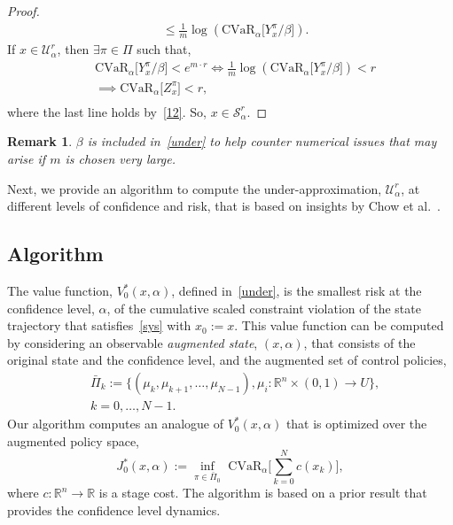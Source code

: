 \documentclass[letterpaper, 10 pt, conference]{ieeeconf}  %
\newtheorem{remark}{Remark}
\begin{document}
\begin{proof}
\begin{equation}
\begin{aligned}
& \leq \frac{1}{m} \log \left(\text{CVaR}_\alpha\big[ Y_x^\pi/\beta \big] \right).
\end{aligned}\label{12}\end{equation}
If $x \in \mathcal{U}_\alpha^r$, then $\exists \pi \in \Pi$ such that,\footnotemark
\begin{equation*}\begin{aligned}
& \text{CVaR}_\alpha \big[ Y_x^\pi /\beta \big] < e^{m\cdot r} \iff \frac{1}{m}\log \left( \text{CVaR}_\alpha \big[  Y_x^\pi /\beta \big] \right) < r \\
& \implies \text{CVaR}_\alpha\big[ Z_x^\pi \big] < r, \\
\end{aligned}\end{equation*}
where the last line holds by~\eqref{12}. So, $x \in \mathcal{S}_\alpha^r$.
\end{proof}
\begin{remark}
$\beta$ is included in~\eqref{under} to help counter numerical issues that may arise if $m$ is chosen very large.
\end{remark}

Next, we provide an algorithm to compute the under-approximation, $\mathcal{U}_\alpha^r$,
at different levels of confidence and risk, that is based on insights by Chow et al.~\cite{chow2015risk}.
\subsection{Algorithm}
The value function, $V_0^*(x,\alpha)$, defined in~\eqref{under},
is the smallest risk at the confidence level, $\alpha$, of the cumulative scaled constraint violation of the state trajectory that satisfies~\eqref{sys} with $x_0 := x$.
This value function can be computed by considering 
an observable \textit{augmented state}, $(x,\alpha)$, that consists of the original state and the confidence level,
and the augmented set of control policies,
\begin{equation}\begin{aligned}
& \bar{\Pi}_k := \{ (\mu_k, \mu_{k+1}, \dots, \mu_{N-1}), \mu_i: \mathbb{R}^n \times (0,1) \rightarrow U \},\\
& k = 0, \dots, N-1.
\end{aligned}\label{augpi}\end{equation}
Our algorithm computes an analogue of $V_0^*(x,\alpha)$ that is optimized over the augmented policy space,
\begin{equation}
J_0^*(x,\alpha) := {\underset{\pi \in \bar{\Pi}_0}\inf} \text{ CVaR}_\alpha \Big[ \textstyle\sum_{k=0}^N c(x_k) \Big],
\label{J0}
\end{equation}
where $c: \mathbb{R}^n \rightarrow \mathbb{R}$ is a stage cost.\footnotemark
{}
The algorithm is based on a prior result that provides the confidence level dynamics.
\end{document}
